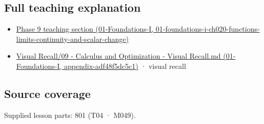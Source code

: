 \subsection{Full teaching explanation}\label{appendix-a59658325cd6-full-teaching-explanation}

\begin{itemize}
\tightlist
\item
  \href{../01-Foundations-I/main.pdf\#nameddest=01-foundations-i-ch020-functions-limits-continuity-and-scalar-change}{Phase 9 teaching section (01-Foundations-I, 01-foundations-i-ch020-functions-limits-continuity-and-scalar-change)}
\item
  \href{../01-Foundations-I/main.pdf\#nameddest=appendix-adf48f5dc5c1}{Visual Recall/09 - Calculus and Optimization - Visual Recall.md (01-Foundations-I, appendix-adf48f5dc5c1)} · visual recall
\end{itemize}

\subsection{Source coverage}\label{appendix-a59658325cd6-source-coverage}

Supplied lesson parts: 801 (T04 · M049).
